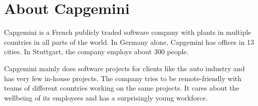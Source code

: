 

\section{About Capgemini}
\label{sec:intro-about-capgemini}

Capgemini is a French publicly traded software company with plants in multiple countries in all parts of the world. In Germany alone, Capgemini has offices in 13 cities. In Stuttgart, the company employs about 300 people.

Capgemini mainly does software projects for clients like the auto industry and has very few in-house projects. The company tries to be remote-friendly with teams of different countries working on the same projects. It cares about the wellbeing of its employees and has a surprisingly young workforce.
